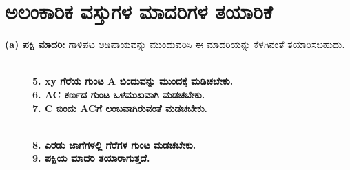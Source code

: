 \section{ಅಲಂಕಾರಿಕ ವಸ್ತುಗಳ ಮಾದರಿಗಳ ತಯಾರಿಕೆ}

\textbf{(a) ಪಕ್ಷಿ ಮಾದರಿ:} ಗಾಳಿಪಟ ಅಡಿಪಾಯವನ್ನು ಮುಂದುವರಿಸಿ ಈ ಮಾದರಿಯನ್ನು ಕೆಳಗಿನಂತೆ ತಯಾರಿಸಬಹುದು.
\begin{figure}[H]
\\
\textbf{5. xy ಗೆರೆಯ ಗುಂಟ A ಬಿಂದುವನ್ನು ಮುಂದಕ್ಕೆ ಮಡಿಚಬೇಕು.}\\
\textbf{6. AC ಕರ್ಣದ ಗುಂಟ ಒಳಮುಖವಾಗಿ ಮಡಚಬೇಕು.}\\
\textbf{7. C ಬಿಂದು ACಗೆ ಲಂಬವಾಗಿರುವಂತೆ ಮಡಚಬೇಕು.}
\end{figure}
\begin{figure}[H]
\\
\textbf{8. ಎರಡು ಜಾಗೆಗಳಲ್ಲಿ ಗೆರೆಗಳ ಗುಂಟ ಮಡಚಬೇಕು.}\\
\textbf{9. ಪಕ್ಷಿಯ ಮಾದರಿ ತಯಾರಾಗುತ್ತದೆ.}
\end{figure}

